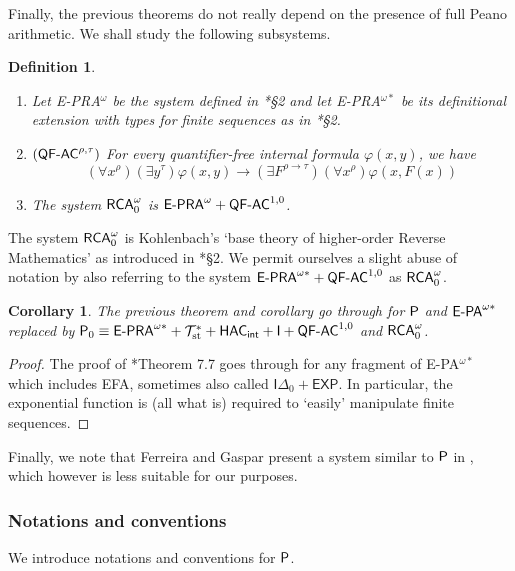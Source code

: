 \documentclass[reqno]{amsart}
\newtheorem{cor}[thm]{Corollary}
\newtheorem{defi}[thm]{Definition}
\newcommand\be{\begin{equation}}
\newcommand\ee{\end{equation}}
\def\bdefi{\begin{defi}\rm}
\def\edefi{\end{defi}}
\def\T{\mathcal{T}}
\def\RCAo{\textup{\textsf{RCA}}_{0}^{\omega}}
\def\P{\textup{\textsf{P}}}
\def\st{\textup{st}}
\def\di{\rightarrow}
\def\QFAC{\textup{\textsf{QF-AC}}}
\def\HAC{\textup{\textsf{HAC}}}
\def\INT{\textup{\textsf{int}}}
\numberwithin{equation}{section}
\numberwithin{thm}{section}
\begin{document}
Finally, the previous theorems do not really depend on the presence of full Peano arithmetic.  
We shall study the following subsystems.   
\bdefi~
\begin{enumerate}
\item Let \textsf{E-PRA}$^{\omega}$ be the system defined in \cite{kohlenbach2}*{\S2} and let \textsf{E-PRA}$^{\omega*}$ 
be its definitional extension with types for finite sequences as in \cite{brie}*{\S2}. 
\item $(\QFAC^{\rho, \tau})$ For every quantifier-free internal formula $\varphi(x,y)$, we have
\be\label{keuze}
(\forall x^{\rho})(\exists y^{\tau})\varphi(x,y) \di (\exists F^{\rho\di \tau})(\forall x^{\rho})\varphi(x,F(x))
\ee
\item The system $\RCAo$ is $\textsf{E-PRA}^{\omega}+\QFAC^{1,0}$.  
\end{enumerate}
\edefi
The system $\RCAo$ is Kohlenbach's `base theory of higher-order Reverse Mathematics' as introduced in \cite{kohlenbach2}*{\S2}.  
We permit ourselves a slight abuse of notation by also referring to the system $\textsf{E-PRA}^{\omega*}+\QFAC^{1,0}$ as $\RCAo$.
\begin{cor}\label{consresultcor2}
The previous theorem and corollary go through for $\P$ and $\textsf{\textup{E-PA}}^{\omega*}$ replaced by $\P_{0}\equiv \textsf{\textup{E-PRA}}^{\omega*}+\T_{\st}^{*} +\HAC_{\INT} +\textsf{\textup{I}}+\QFAC^{1,0}$ and $\RCAo$.  
\end{cor}
\begin{proof}
The proof of \cite{brie}*{Theorem 7.7} goes through for any fragment of \textsf{E-PA}$^{\omega{*}}$ which includes \textsf{EFA}, sometimes also called $\textsf{I}\Delta_{0}+\textsf{EXP}$.  
In particular, the exponential function is (all what is) required to `easily' manipulate finite sequences.    
\end{proof}
Finally, we note that Ferreira and Gaspar present a system similar to $\P$ in \cite{fega}, which however is less suitable for our purposes.    

\subsubsection{Notations and conventions}
We introduce notations and conventions for $\P$.  

\medskip
\end{document}
